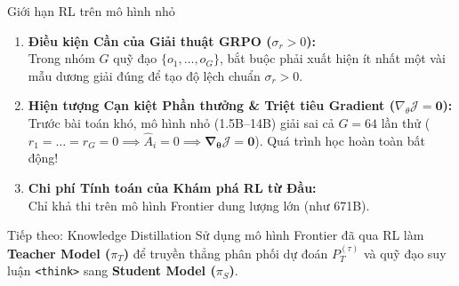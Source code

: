 \begin{frame}{Giới hạn RL trên mô hình nhỏ}
  \small
  \begin{enumerate}\setlength{\itemsep}{4pt}
    \item \textbf{Điều kiện Cần của Giải thuật GRPO ($\sigma_r > 0$):}\\
      \small Trong nhóm $G$ quỹ đạo $\{o_1, \dots, o_G\}$, bắt buộc phải xuất hiện ít nhất một vài mẫu dương giải đúng để tạo độ lệch chuẩn $\sigma_r > 0$.
    \item \textbf{Hiện tượng Cạn kiệt Phần thưởng \& Triệt tiêu Gradient ($\nabla_\theta \mathcal{J} = \mathbf{0}$):}\\
      \small Trước bài toán khó, mô hình nhỏ (1.5B--14B) giải sai cả $G = 64$ lần thử ($r_1 = \dots = r_G = 0 \implies \hat{A}_i = 0 \implies \mathbf{\nabla_\theta \mathcal{J} = 0}$). Quá trình học hoàn toàn bất động!
    \item \textbf{Chi phí Tính toán của Khám phá RL từ Đầu:}\\
      \small Chỉ khả thi trên mô hình Frontier dung lượng lớn (như 671B).
  \end{enumerate}

  \vspace{0.06cm}
  \begin{exampleblock}{Tiếp theo: Knowledge Distillation}
    \small
    Sử dụng mô hình Frontier đã qua RL làm \textbf{Teacher Model ($\pi_T$)} để truyền thẳng phân phối dự đoán $P_T^{(\tau)}$ và quỹ đạo suy luận \texttt{<think>} sang \textbf{Student Model ($\pi_S$)}.
  \end{exampleblock}
  \par\vspace{0pt}
\end{frame}
